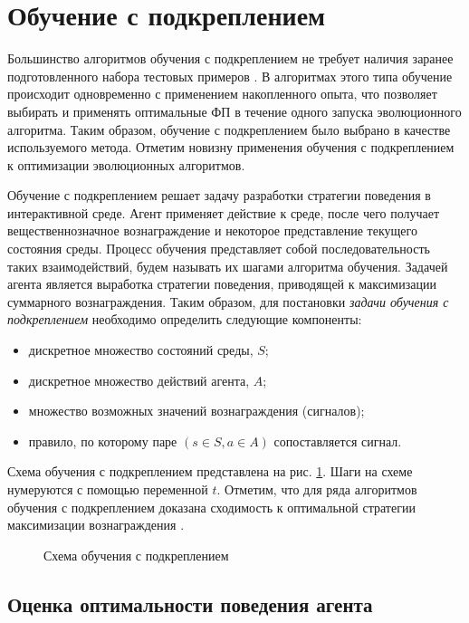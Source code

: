 
	
\section{Обучение с подкреплением}
	\label{rl}
	Большинство алгоритмов обучения с подкреплением \cite{sutton} не требует наличия заранее подготовленного набора тестовых примеров \cite{survey}. В алгоритмах этого типа обучение происходит одновременно с применением накопленного опыта, что позволяет выбирать и применять оптимальные ФП в течение одного запуска эволюционного алгоритма. Таким образом, обучение с подкреплением было выбрано в качестве используемого метода. Отметим новизну применения обучения с подкреплением к оптимизации эволюционных алгоритмов.
	
	Обучение с подкреплением решает задачу разработки стратегии поведения в интерактивной среде. Агент применяет действие к среде, после чего получает вещественнозначное вознаграждение и некоторое представление текущего состояния среды. Процесс обучения представляет собой последовательность таких взаимодействий, будем называть их шагами алгоритма обучения. Задачей агента является выработка стратегии поведения, приводящей к максимизации суммарного вознаграждения. Таким образом, для постановки \emph{задачи обучения с подкреплением} необходимо определить следующие компоненты:
	\begin{itemize}
		\item дискретное множество состояний среды, $S$;
		\item дискретное множество действий агента, $A$;
		\item множество возможных значений вознаграждения (сигналов);
		\item правило, по которому паре $(s \in S, a \in A)$ сопоставляется сигнал.
	\end{itemize}
	
	Схема обучения с подкреплением представлена на рис. \ref{rl-scheme}. Шаги на схеме нумеруются с помощью переменной $t$. Отметим, что для ряда алгоритмов обучения с подкреплением доказана сходимость к оптимальной стратегии максимизации вознаграждения \cite{systems}.
	
	\begin{figure}[h!]
	\caption{Схема обучения с подкреплением}
	\label{rl-scheme}
	\end{figure}
		
		\subsection{Оценка оптимальности поведения агента}
		\label{mark}
		
